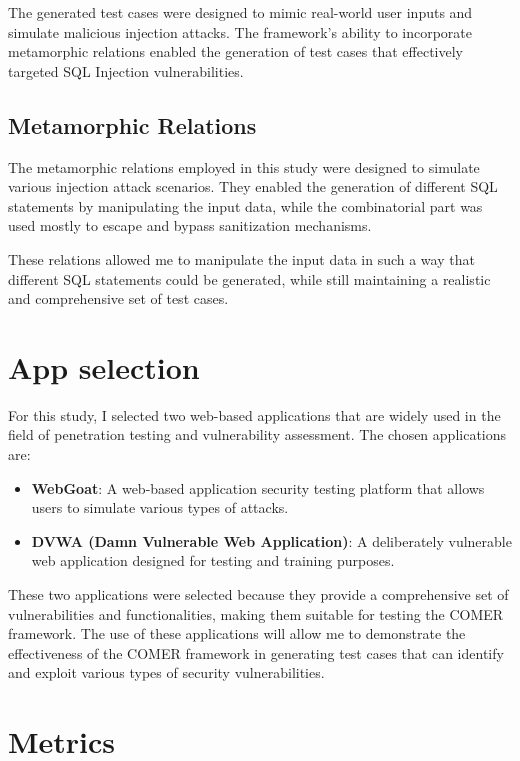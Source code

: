 The generated test cases were designed to mimic real-world user inputs and simulate malicious injection attacks. The framework's ability to incorporate metamorphic relations enabled the generation of test cases that effectively targeted SQL Injection vulnerabilities.

\subsection{Metamorphic Relations}\label{sec:metamorphic-relations}

The metamorphic relations employed in this study were designed to simulate various injection attack scenarios. They enabled the generation of different SQL statements by manipulating the input data, while the combinatorial part was used mostly to escape and bypass sanitization mechanisms.

These relations allowed me to manipulate the input data in such a way that different SQL statements could be generated, while still maintaining a realistic and comprehensive set of test cases.

\section{App selection}\label{sec:app-selection}

For this study, I selected two web-based applications that are widely used in the field of penetration testing and vulnerability assessment. The chosen applications are:

\begin{itemize}
	\item \textbf{WebGoat}: A web-based application security testing platform that allows users to simulate various types of attacks. \cite{Webgoat}

	\item \textbf{DVWA (Damn Vulnerable Web Application)}: A deliberately vulnerable web application designed for testing and training purposes. \cite{DVWA}
\end{itemize}

These two applications were selected because they provide a comprehensive set of vulnerabilities and functionalities, making them suitable for testing the COMER framework. The use of these applications will allow me to demonstrate the effectiveness of the COMER framework in generating test cases that can identify and exploit various types of security vulnerabilities.

\section{Metrics}

